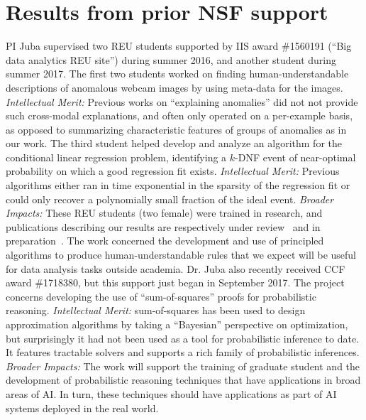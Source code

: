\documentclass[12pt]{article}
\begin{document}
\section{Results from prior NSF support}
PI Juba supervised two REU students supported by IIS award \#1560191 (``Big data analytics REU site'') during summer 2016, and another student during summer 2017. The first two students worked on finding human-understandable descriptions of anomalous webcam images by using meta-data for the images. {\em Intellectual Merit:} Previous works on ``explaining anomalies'' did not not provide such cross-modal explanations, and often only operated on a per-example basis, as opposed to summarizing characteristic features of groups of anomalies as in our work. The third student helped develop and analyze an algorithm for the conditional linear regression problem, identifying a $k$-DNF event of near-optimal probability on which a good regression fit exists. {\em Intellectual Merit:} Previous algorithms either ran in time exponential in the sparsity of the regression fit or could only recover a polynomially small fraction of the ideal event. {\em Broader Impacts:} These REU students (two female) were trained in research, and publications describing our results are respectively under review~\cite{qi2018} and in preparation~\cite{calderon2018}. The work concerned the development and use of principled algorithms to produce human-understandable rules that we expect will be useful for data analysis tasks outside academia. Dr. Juba also recently received CCF award \#1718380, but this support just began in September 2017. The project concerns developing the use of ``sum-of-squares'' proofs for probabilistic reasoning. {\em Intellectual Merit:} sum-of-squares has been used to design approximation algorithms by taking a ``Bayesian'' perspective on optimization, but surprisingly it had not been used as a tool for probabilistic inference to date. It features tractable solvers and supports a rich family of probabilistic inferences. {\em Broader Impacts:} The work will support the training of graduate student and the development of probabilistic reasoning techniques that have applications in broad areas of AI. In turn, these techniques should have applications as part of AI systems deployed in the real world.

\pagebreak



\newpage
\end{document}
